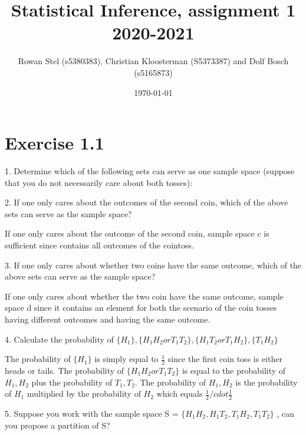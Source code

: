 \documentclass[a4paper,11pt]{article}
\author{Rowan Stel (s5380383), Christian Kloosterman (S5373387) and Dolf Bosch (s5165873)}
\date{\today}
\title{Statistical Inference, assignment 1\\
  2020-2021
  }
\newcommand{\1}[1]{\,I_{#1}} %
\begin{document}
\maketitle

\section{Exercise 1.1}

1. Determine which of the following sets can serve as one sample space (suppose that you do not necessarily care about both tosses):

2. If one only cares about the outcomes of the second coin, which of the above sets can serve as the sample space?

If one only cares about the outcome of the second coin, sample space c is sufficient since contains all outcomes of the cointoss. 

3. If one only cares about whether two coins have the same outcome, which of the above sets can serve as the sample space?

If one only cares about whether the two coin have the same outcome, sample space d since it contains an element for both the scenario of the coin tosses having different outcomes and having the same outcome. %

4. Calculate the probability of  $\{H_1\}, \{H_1 H_2 or T_1T_2\}, \{H_1T_2 or T_1 H_2\}, \{T_1 H_2\}$

The probability of  $\{H_1\}$ is simply equal to $\frac{1}{2}$ since the first coin toss is either heads or tails. The probability of $\{H_1 H_2 or T_1T_2\}$ is equal to the probability of $H_1, H_2$ plus the probability of $T_1, T_2$. The probability of $H_1, H_2$ is the probability of $H_1$ multiplied by the probability of $H_2$ which equals $\frac{1}{2}/cdot \frac{1}{2}$


5. Suppose you work with the sample space S = $\{H_1 H_2, H_1T_2, T_1 H_2, T_1T_2\}$ , can you propose a partition of S?
\end{document}
